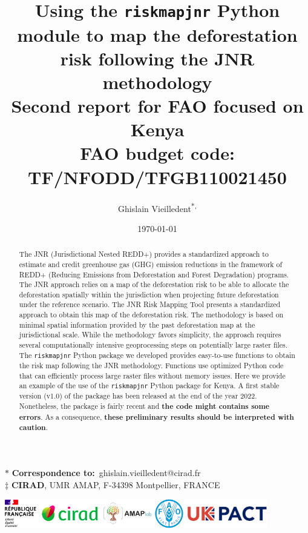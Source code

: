 \documentclass[paper=a4, 12pt, DIV=12]{scrartcl}
\author{Ghislain Vieilledent\textsuperscript{\(\ast\), \ddag{}}}
\date{\today}
\title{Using the \texttt{riskmapjnr} Python module to map the deforestation risk following the JNR methodology\\\medskip
\large \textcolor{pnasblue}{Second report for FAO focused on Kenya\\ FAO budget code: TF/NFODD/TFGB110021450}}
\begin{document}
\maketitle

\vspace{-1cm}
\begin{center}
  $\ast$ \textbf{Correspondence to:}~ghislain.vieilledent@cirad.fr \\
  $\ddag$ \textbf{CIRAD}, UMR AMAP, F-34398 Montpellier, FRANCE \\
\end{center}
\vspace{0.25cm}

\begin{abstract}
The JNR (Jurisdictional Nested REDD+) provides a standardized approach to estimate and credit greenhouse gas (GHG) emission reductions in the framework of REDD+ (Reducing Emissions from Deforestation and Forest Degradation) programs. The JNR approach relies on a map of the deforestation risk to be able to allocate the deforestation spatially within the jurisdiction when projecting future deforestation under the reference scenario. The JNR Risk Mapping Tool presents a standardized approach to obtain this map of the deforestation risk. The methodology is based on minimal spatial information provided by the past deforestation map at the jurisdictional scale. While the methodology favors simplicity, the approach requires several computationally intensive geoprocessing steps on potentially large raster files. The \texttt{riskmapjnr} Python package we developed provides easy-to-use functions to obtain the risk map following the JNR methodology. Functions use optimized Python code that can efficiently process large raster files without memory issues. Here we provide an example of the use of the \texttt{riskmapjnr} Python package for Kenya. A first stable version (v1.0) of the package has been released at the end of the year 2022. Nonetheless, the package is fairly recent and \textbf{the code might contains some errors}. As a consequence, \textbf{these preliminary results should be interpreted with caution}.
\end{abstract}

\vspace{0.25cm}
\begin{center}
\includegraphics[width=0.86\textwidth]{images/partners_logos.png}\enlargethispage{2\baselineskip}
\end{center}
\newpage
\tableofcontents
\newpage
\listoffigures
\newpage
\end{document}
